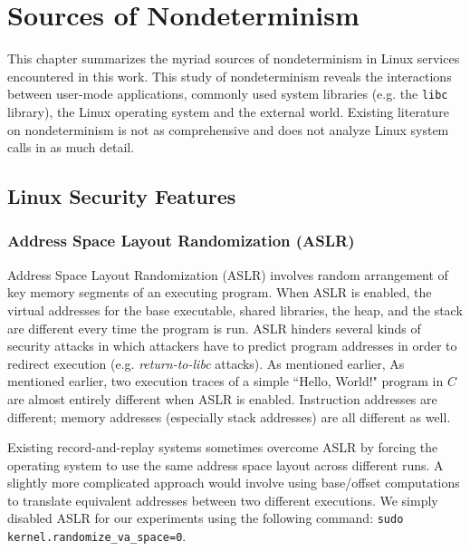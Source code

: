 \newenvironment{mylisting}
{\begin{list}{}{\setlength{\leftmargin}{1em}}\item\scriptsize\bfseries}
{\end{list}}

\chapter{Sources of Nondeterminism}
This chapter summarizes the myriad sources of nondeterminism
in Linux services encountered in this work. This
study of nondeterminism reveals
the interactions between user-mode
applications, commonly used system libraries (e.g. the \texttt{libc} library),
the Linux operating system and the external world.
Existing literature on nondeterminism is not 
as comprehensive and does not analyze
Linux system calls in as much detail. 

\section{Linux Security Features} \label{ch3:security}
\subsection{Address Space Layout Randomization (ASLR)}
Address Space Layout Randomization (ASLR) involves random arrangement of
key memory segments of an executing program. When ASLR is enabled,
the virtual addresses for the base executable, shared libraries, 
the heap, and the stack are different every time the program is run.
ASLR hinders several kinds of security attacks in which attackers have to predict
program addresses in order to redirect execution (e.g.
\emph{return-to-libc} attacks). 
As mentioned earlier, As mentioned earlier, two execution traces of a
simple ``Hello, World!" program in $C$ are almost entirely different
when ASLR is enabled. Instruction addresses are different; 
memory addresses (especially stack addresses) are all different as well.

Existing record-and-replay systems sometimes overcome ASLR by
forcing the operating system to use the same address space layout across
different runs. A slightly more complicated approach would involve
using base/offset computations to translate equivalent 
addresses between two different executions. 
We simply disabled ASLR for our experiments using the following command:
\texttt {sudo kernel.randomize\_va\_space=0}.

